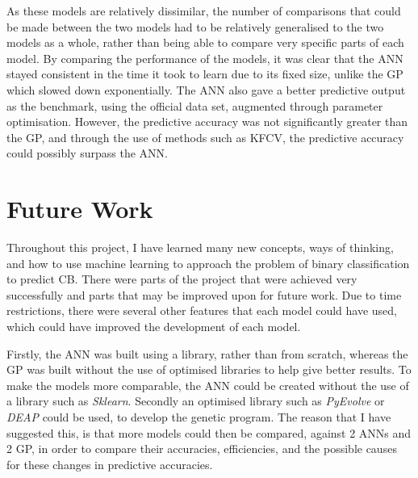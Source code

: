 \documentclass[11pt]{article}
\begin{document}
As these models are relatively dissimilar, the number of comparisons that could be made between the two models had to be relatively generalised to the two models as a whole, rather than being able to compare very specific parts of each model. By comparing the performance of the models, it was clear that the ANN stayed consistent in the time it took to learn due to its fixed size, unlike the GP which slowed down exponentially. The ANN also gave a better predictive output as the benchmark, using the official data set, augmented through parameter optimisation. However, the predictive accuracy was not significantly greater than the GP, and through the use of methods such as KFCV, the predictive accuracy could possibly surpass the ANN. 

\section{Future Work}\label{sec:FWC}
Throughout this project, I have learned many new concepts, ways of thinking, and how to use machine learning to approach the problem of binary classification to predict CB. There were parts of the project that were achieved very successfully and parts that may be improved upon for future work.  Due to time restrictions, there were several other features that each model could have used, which could have improved the development of each model.

Firstly, the ANN was built using a library, rather than from scratch, whereas the GP was built without the use of optimised libraries to help give better results. To make the models more comparable, the ANN could be created without the use of a library such as \textit{Sklearn}. Secondly an optimised library such as \textit{PyEvolve} or \textit{DEAP} could be used, to develop the genetic program. The reason that I have suggested this, is that more models could then be compared, against 2 ANNs and 2 GP, in order to compare their accuracies, efficiencies, and the possible causes for these changes in predictive accuracies. 
\end{document}
